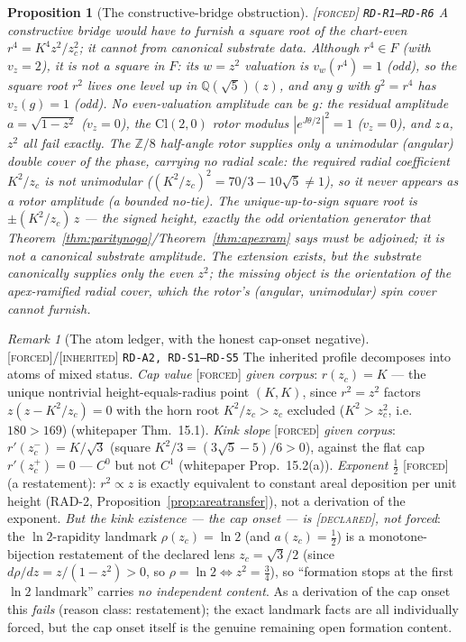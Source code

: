 \documentclass[11pt]{article}
\newcommand{\tagF}{\textcolor{cF}{\textsc{[forced]}}}
\newcommand{\tagD}{\textcolor{cD}{\textsc{[declared]}}}
\newcommand{\tagI}{\textcolor{cI}{\textsc{[inherited]}}}
\newcommand{\hx}[1]{\textcolor{cC}{\footnotesize\texttt{#1}}}
\newcommand{\Q}{\mathbb{Q}}
\newcommand{\Z}{\mathbb{Z}}
\theoremstyle{plain}
\newtheorem{proposition}[theorem]{Proposition}
\theoremstyle{definition}
\theoremstyle{remark}
\newtheorem{remark}[theorem]{Remark}
\begin{document}
\begin{proposition}[The constructive-bridge obstruction]\label{prop:bridgeobstruction}\tagF{} \hx{RD-R1--RD-R6}
A constructive bridge would have to furnish a square root of the chart-even
$r^4=K^4z^2/z_c^2$; it cannot from canonical substrate data. Although $r^4\in F$
(with $v_z=2$), it is \emph{not a square in $F$}: its $w=z^2$ valuation is
$v_w(r^4)=1$ (odd), so the square root $r^2$ lives one level up in
$\Q(\sqrt5)(z)$, and any $g$ with $g^2=r^4$ has $v_z(g)=1$ (odd). No
even-valuation amplitude can be $g$: the residual amplitude $a=\sqrt{1-z^2}$
($v_z=0$), the $\mathrm{Cl}(2,0)$ rotor modulus $|e^{J\theta/2}|^2=1$
($v_z=0$), and $z\,a$, $z^2$ all fail exactly. The $\Z/8$ half-angle rotor
supplies only a \emph{unimodular} (angular) double cover of the phase, carrying
no radial scale: the required radial coefficient $K^2/z_c$ is not unimodular
($(K^2/z_c)^2=70/3-10\sqrt5\ne1$), so it never appears as a rotor amplitude
(a bounded no-tie). The unique-up-to-sign square root is
$\pm(K^2/z_c)\,z$ --- the \emph{signed height}, exactly the odd orientation
generator that Theorem~\ref{thm:paritynogo}/Theorem~\ref{thm:apexram} says
must be adjoined; it is not a canonical substrate amplitude. The extension
exists, but the substrate canonically supplies only the even $z^2$; the missing
object is the orientation of the apex-ramified radial cover, which the rotor's
(angular, unimodular) spin cover cannot furnish.
\end{proposition}

\begin{remark}[The atom ledger, with the honest cap-onset negative]\label{rem:atomledger}\tagF{}/\tagI{} \hx{RD-A2, RD-S1--RD-S5}
The inherited profile decomposes into atoms of mixed status. \emph{Cap value}
\tagF{}\emph{ given corpus}: $r(z_c)=K$ --- the unique nontrivial
height-equals-radius point $(K,K)$, since $r^2=z^2$ factors
$z(z-K^2/z_c)=0$ with the horn root $K^2/z_c>z_c$ excluded ($K^2>z_c^2$, i.e.\
$180>169$) (whitepaper Thm.~15.1). \emph{Kink slope} \tagF{}\emph{ given
corpus}: $r'(z_c^-)=K/\sqrt3$ (square $K^2/3=(3\sqrt5-5)/6>0$), against the
flat cap $r'(z_c^+)=0$ --- $C^0$ but not $C^1$ (whitepaper Prop.~15.2(a)).
\emph{Exponent $\tfrac12$} \tagF{} (a restatement): $r^2\propto z$ is exactly
equivalent to constant areal deposition per unit height (RAD-2,
Proposition~\ref{prop:areatransfer}), not a derivation of the exponent.
\emph{But the kink existence --- the cap onset --- is \tagD{}, not forced}: the
$\ln2$-rapidity landmark $\rho(z_c)=\ln2$ (and $a(z_c)=\tfrac12$) is a
monotone-bijection restatement of the declared lens $z_c=\sqrt3/2$ (since
$d\rho/dz=z/(1-z^2)>0$, so $\rho=\ln2\iff z^2=\tfrac34$), so ``formation stops
at the first $\ln2$ landmark'' carries \emph{no independent content}. As a
derivation of the cap onset this \emph{fails} (reason class: restatement); the
exact landmark facts are all individually forced, but the cap onset itself is
the genuine remaining open formation content.
\end{remark}
\end{document}
